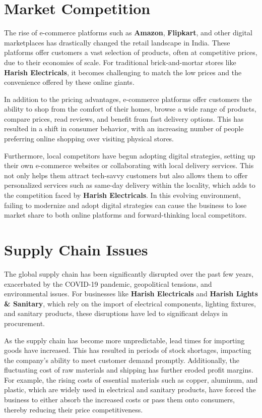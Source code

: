 \documentclass[a4paper,12pt]{report}
\begin{document}
\section{Market Competition}
The rise of e-commerce platforms such as \textbf{Amazon}, \textbf{Flipkart}, and other digital marketplaces has drastically changed the retail landscape in India. These platforms offer customers a vast selection of products, often at competitive prices, due to their economies of scale. For traditional brick-and-mortar stores like \textbf{Harish Electricals}, it becomes challenging to match the low prices and the convenience offered by these online giants.

In addition to the pricing advantages, e-commerce platforms offer customers the ability to shop from the comfort of their homes, browse a wide range of products, compare prices, read reviews, and benefit from fast delivery options. This has resulted in a shift in consumer behavior, with an increasing number of people preferring online shopping over visiting physical stores.

Furthermore, local competitors have begun adopting digital strategies, setting up their own e-commerce websites or collaborating with local delivery services. This not only helps them attract tech-savvy customers but also allows them to offer personalized services such as same-day delivery within the locality, which adds to the competition faced by \textbf{Harish Electricals}. In this evolving environment, failing to modernize and adopt digital strategies can cause the business to lose market share to both online platforms and forward-thinking local competitors.

\section{Supply Chain Issues}
The global supply chain has been significantly disrupted over the past few years, exacerbated by the COVID-19 pandemic, geopolitical tensions, and environmental issues. For businesses like \textbf{Harish Electricals} and \textbf{Harish Lights \& Sanitary}, which rely on the import of electrical components, lighting fixtures, and sanitary products, these disruptions have led to significant delays in procurement.

As the supply chain has become more unpredictable, lead times for importing goods have increased. This has resulted in periods of stock shortages, impacting the company’s ability to meet customer demand promptly. Additionally, the fluctuating cost of raw materials and shipping has further eroded profit margins. For example, the rising costs of essential materials such as copper, aluminum, and plastic, which are widely used in electrical and sanitary products, have forced the business to either absorb the increased costs or pass them onto consumers, thereby reducing their price competitiveness.
\end{document}
